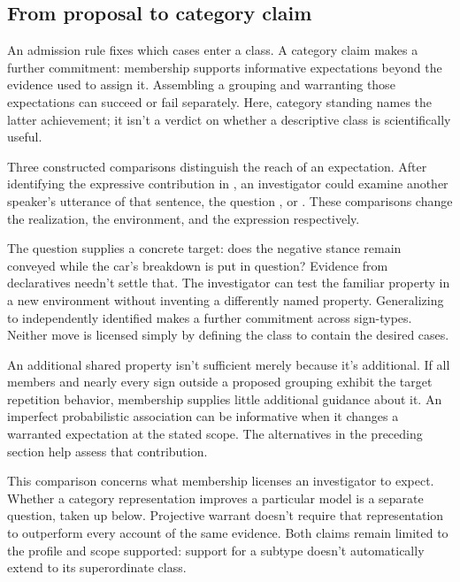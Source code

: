 \documentclass[12pt]{article}
\begin{document}
\subsection{From proposal to category claim}

An admission rule fixes which cases enter a class. A category claim
makes a further commitment: membership supports informative expectations
beyond the evidence used to assign it. Assembling a grouping and
warranting those expectations can succeed or fail separately. Here,
category standing names the latter achievement; it isn't a verdict
on whether a descriptive class is scientifically useful.

Three constructed comparisons distinguish the reach of an expectation.
After identifying the expressive contribution in , an investigator could examine another speaker's utterance
of that sentence, the question ,
or . These comparisons change the
realization, the environment, and the expression respectively.

The question supplies a concrete target: does the negative stance
remain conveyed while the car's breakdown is put in question? Evidence
from declaratives needn't settle that. The investigator can test the
familiar property in a new environment without inventing a differently
named property. Generalizing to independently identified 
makes a further commitment across sign-types. Neither move is licensed
simply by defining the class to contain the desired cases.

An additional shared property isn't sufficient merely because it's
additional. If all members and nearly every sign outside a proposed
grouping exhibit the target repetition behavior, membership supplies
little additional guidance about it. An imperfect probabilistic association can be
informative when it changes a warranted expectation at the stated
scope. The alternatives in the preceding section help assess that
contribution.

This comparison concerns what membership licenses an investigator to
expect. Whether a category representation improves a particular model
is a separate question, taken up below. Projective warrant doesn't
require that representation to outperform every account of the same
evidence. Both claims remain limited to the profile and scope supported:
support for a subtype doesn't automatically extend to its superordinate
class.
\end{document}
